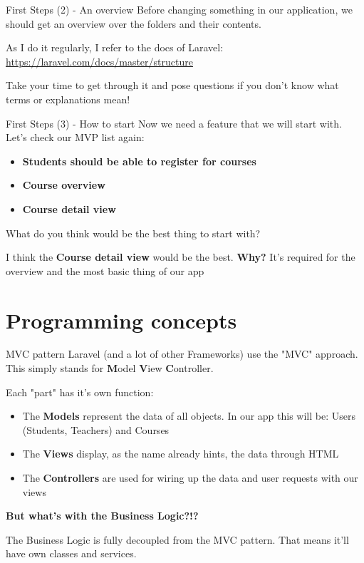 \begin{frame}{First Steps (2) - An overview}
	Before changing something in our application, we should get an overview over the folders and their contents. \pause
	
	As I do it regularly, I refer to the docs of Laravel: \url{https://laravel.com/docs/master/structure}
	
	Take your time to get through it and pose questions if you don't know what terms or explanations mean!
\end{frame}

\begin{frame}{First Steps (3) - How to start}
	Now we need a feature that we will start with. Let's check our MVP list again: \pause
	\begin{itemize}
		\item \textbf{Students should be able to register for courses} \pause
		\item \textbf{Course overview} \pause			
		\item \textbf{Course detail view}\pause	
	\end{itemize}

	What do you think would be the best thing to start with? \pause
	
	I think the \textbf{Course detail view} would be the best. \pause
	\textbf{Why?} It's required for the overview and the most basic thing of our app
\end{frame}

\section{Programming concepts}

\begin{frame}{MVC pattern}
	Laravel (and a lot of other Frameworks) use the "MVC" approach. This simply stands for \textbf{M}odel \textbf{V}iew \textbf{C}ontroller. \pause
	
	Each "part" has it's own function: \pause
	
	\begin{itemize}
		\item The \textbf{Models} represent the data of all objects. In our app this will be: \pause Users (Students, Teachers) and Courses \pause		
		\item The \textbf{Views} display, as the name already hints, the data through HTML \pause
		\item The \textbf{Controllers} are used for wiring up the data and user requests with our views \pause
	\end{itemize}

	\textbf{But what's with the Business Logic?!?} \pause
	
	The Business Logic is fully decoupled from the MVC pattern. That means it'll have own classes and services.
\end{frame}

